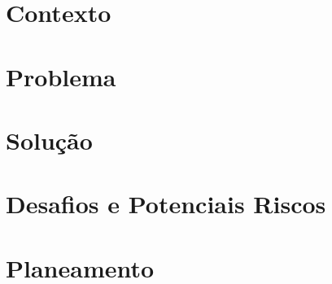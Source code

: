 \documentclass[a4paper,twoside,11pt]{article}
\begin{document}
    

    \section{Contexto}\label{sec:contexto}
    

    \section{Problema}\label{sec:problema}
    

    \section{Solução}\label{sec:solucao}
    

    \section{Desafios e Potenciais Riscos}\label{sec:desafios-riscos}
    

    \section{Planeamento}\label{sec:planeamento}
    

    
    
\end{document}
